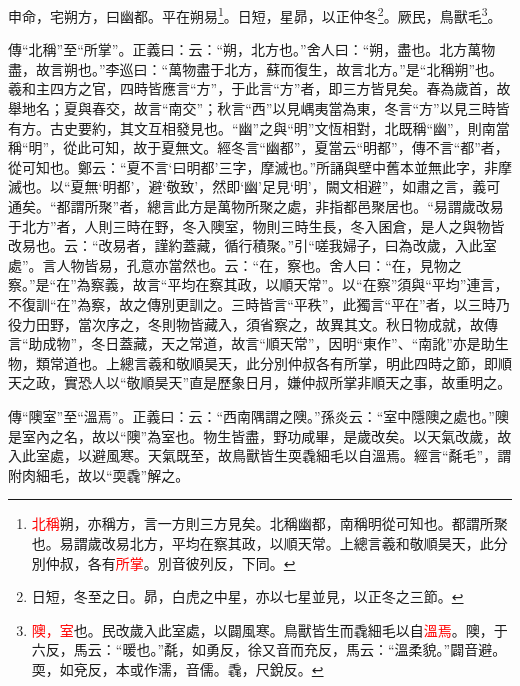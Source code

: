 申命，宅朔方，曰幽都。平在朔易\footnote{\textcolor{red}{北稱}朔，亦稱方，言一方則三方見矣。北稱幽都，南稱明從可知也。都謂所聚也。易謂歲改易北方，平均在察其政，以順天常。上總言羲和敬順昊天，此分別仲叔，各有\textcolor{red}{所掌}。別音彼列反，下同。}。日短，星昴，以正仲冬\footnote{日短，冬至之日。昴，白虎之中星，亦以七星並見，以正冬之三節。}。厥民，鳥獸毛\footnote{\textcolor{red}{隩，室}也。民改歲入此室處，以闢風寒。鳥獸皆生而毳細毛以自\textcolor{red}{溫焉}。隩，于六反，馬云：“暖也。”氄，如勇反，徐又音而充反，馬云：“溫柔貌。”闢音避。耎，如兗反，本或作濡，音儒。毳，尺銳反。}。

{\noindent\zhuan{}\fzbyks 傳“北稱”至“所掌”。正義曰：云：“朔，北方也。”舍人曰：“朔，盡也。北方萬物盡，故言朔也。”李巡曰：“萬物盡于北方，蘇而復生，故言北方。”是“北稱朔”也。羲和主四方之官，四時皆應言“方”，于此言“方”者，即三方皆見矣。春為歲首，故舉地名；夏與春交，故言“南交”；秋言“西”以見嵎夷當為東，冬言“方”以見三時皆有方。古史要約，其文互相發見也。“幽”之與“明”文恆相對，北既稱“幽”，則南當稱“明”，從此可知，故于夏無文。經冬言“幽都”，夏當云“明都”，傳不言“都”者，從可知也。鄭云：“夏不言‘曰明都’三字，摩滅也。”所誦與壁中舊本並無此字，非摩滅也。以“夏無‘明都’，避‘敬致’，然即‘幽’足見‘明’，闕文相避”，如肅之言，義可通矣。“都謂所聚”者，總言此方是萬物所聚之處，非指都邑聚居也。“易謂歲改易于北方”者，人則三時在野，冬入隩室，物則三時生長，冬入囷倉，是人之與物皆改易也。云：“改易者，謹約蓋藏，循行積聚。”引“嗟我婦子，曰為改歲，入此室處”。言人物皆易，孔意亦當然也。云：“在，察也。舍人曰：“在，見物之察。”是“在”為察義，故言“平均在察其政，以順天常”。以“在察”須與“平均”連言，不復訓“在”為察，故之傳別更訓之。三時皆言“平秩”，此獨言“平在”者，以三時乃役力田野，當次序之，冬則物皆藏入，須省察之，故異其文。秋日物成就，故傳言“助成物”，冬日蓋藏，天之常道，故言“順天常”，因明“東作”、“南訛”亦是助生物，類常道也。上總言羲和敬順昊天，此分別仲叔各有所掌，明此四時之節，即順天之政，實恐人以“敬順昊天”直是歷象日月，嫌仲叔所掌非順天之事，故重明之。 \par}

{\noindent\zhuan{}\fzbyks 傳“隩室”至“溫焉”。正義曰：云：“西南隅謂之隩。”孫炎云：“室中隱隩之處也。”隩是室內之名，故以“隩”為室也。物生皆盡，野功咸畢，是歲改矣。以天氣改歲，故入此室處，以避風寒。天氣既至，故鳥獸皆生耎毳細毛以自溫焉。經言“氄毛”，謂附肉細毛，故以“耎毳”解之。 \par}

